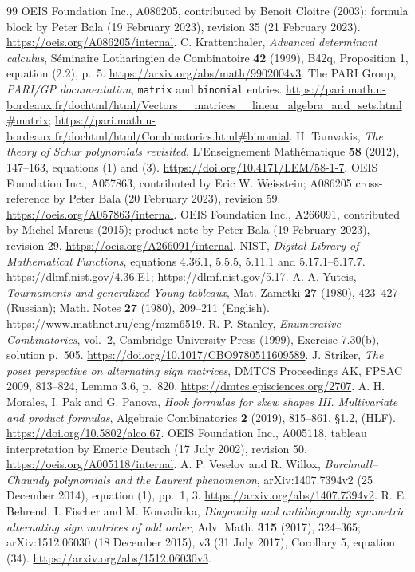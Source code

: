 \documentclass[11pt]{article}
\begin{document}
\clearpage
\begin{thebibliography}{99}
 OEIS Foundation Inc., A086205, contributed by Benoit Cloitre
(2003); formula block by Peter Bala (19 February 2023), revision 35
(21 February 2023). \url{https://oeis.org/A086205/internal}.
 C. Krattenthaler, \emph{Advanced determinant calculus},
S\'eminaire Lotharingien de Combinatoire \textbf{42} (1999), B42q,
Proposition 1, equation (2.2), p.~5.
\url{https://arxiv.org/abs/math/9902004v3}.
 The PARI Group, \emph{PARI/GP documentation},
\texttt{matrix} and \texttt{binomial} entries.
\url{https://pari.math.u-bordeaux.fr/dochtml/html/Vectors__matrices__linear_algebra_and_sets.html#matrix};
\url{https://pari.math.u-bordeaux.fr/dochtml/html/Combinatorics.html#binomial}.
 H. Tamvakis, \emph{The theory of Schur polynomials
revisited}, L'Enseignement Math\'ematique \textbf{58} (2012), 147--163,
equations (1) and (3). \url{https://doi.org/10.4171/LEM/58-1-7}.
 OEIS Foundation Inc., A057863, contributed by Eric W. Weisstein;
A086205 cross-reference by Peter Bala (20 February 2023), revision 59.
\url{https://oeis.org/A057863/internal}.
 OEIS Foundation Inc., A266091, contributed by Michel Marcus
(2015); product note by Peter Bala (19 February 2023), revision 29.
\url{https://oeis.org/A266091/internal}.
 NIST, \emph{Digital Library of Mathematical Functions},
equations 4.36.1, 5.5.5, 5.11.1 and 5.17.1--5.17.7.
\url{https://dlmf.nist.gov/4.36.E1}; \url{https://dlmf.nist.gov/5.17}.
 A. A. Yutcis, \emph{Tournaments and generalized Young
tableaux}, Mat. Zametki \textbf{27} (1980), 423--427 (Russian);
Math. Notes \textbf{27} (1980), 209--211 (English).
\url{https://www.mathnet.ru/eng/mzm6519}.
 R. P. Stanley, \emph{Enumerative Combinatorics}, vol.~2,
Cambridge University Press (1999), Exercise 7.30(b), solution p.~505.
\url{https://doi.org/10.1017/CBO9780511609589}.
 J. Striker, \emph{The poset perspective on alternating
sign matrices}, DMTCS Proceedings AK, FPSAC 2009, 813--824,
Lemma 3.6, p.~820. \url{https://dmtcs.episciences.org/2707}.
 A. H. Morales, I. Pak and G. Panova,
\emph{Hook formulas for skew shapes III. Multivariate and product formulas},
Algebraic Combinatorics \textbf{2} (2019), 815--861, \S1.2, (HLF).
\url{https://doi.org/10.5802/alco.67}.
 OEIS Foundation Inc., A005118, tableau interpretation
by Emeric Deutsch (17 July 2002), revision 50.
\url{https://oeis.org/A005118/internal}.
 A. P. Veselov and R. Willox,
\emph{Burchnall--Chaundy polynomials and the Laurent phenomenon},
arXiv:1407.7394v2 (25 December 2014), equation (1), pp.~1, 3.
\url{https://arxiv.org/abs/1407.7394v2}.
 R. E. Behrend, I. Fischer and M. Konvalinka,
\emph{Diagonally and antidiagonally symmetric alternating sign matrices
of odd order}, Adv. Math. \textbf{315} (2017), 324--365;
arXiv:1512.06030 (18 December 2015), v3 (31 July 2017),
Corollary 5, equation (34). \url{https://arxiv.org/abs/1512.06030v3}.
\end{thebibliography}
\end{document}
